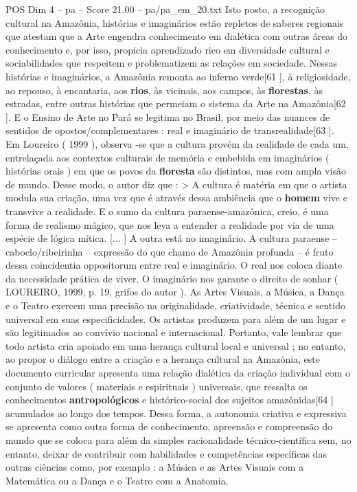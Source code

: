 \begin{textsample}{POS Dim 4 – pa – Score 21.00 – pa/pa\_em\_20.txt}
Isto posto, a recognição cultural na Amazônia, histórias e imaginários estão repletos de saberes regionais que atestam que a Arte engendra conhecimento em dialética com outras áreas do conhecimento e, por isso, propicia aprendizado rico em diversidade cultural e sociabilidades que respeitem e problematizem as relações em sociedade.
Nessas histórias e imaginários, a Amazônia remonta ao inferno verde[61 ], à religiosidade, ao repouso, à encantaria, aos \textbf{rios}, às vicinais, aos campos, às \textbf{florestas}, às estradas, entre outras histórias que permeiam o sistema da Arte na Amazônia[62 ].
E o Ensino de Arte no Pará se legitima no Brasil, por meio das nuances de sentidos de opostos/complementares : real e imaginário de transrealidade[63 ].
Em Loureiro ( 1999 ), observa -se que a cultura provém da realidade de cada um, entrelaçada aos contextos culturais de memória e embebida em imaginários ( histórias orais ) em que os povos da \textbf{floresta} são distintos, mas com ampla visão de mundo.
Desse modo, o autor diz que : > A cultura é matéria em que o artista modula sua criação, uma vez que é através dessa ambiência que o \textbf{homem} vive e transvive a realidade.
E o sumo da cultura paraense-amazônica, creio, é uma forma de realismo mágico, que nos leva a entender a realidade por via de uma espécie de lógica mítica. [... ] A outra está no imaginário.
A cultura paraense – caboclo/ribeirinha – expressão do que chamo de Amazônia profunda – é fruto dessa coincidentia oppositorum entre real e imaginário.
O real nos coloca diante da necessidade prática de viver.
O imaginário nos garante o direito de sonhar ( LOUREIRO, 1999, p. 19, grifos do autor ).
As Artes Visuais, a Música, a Dança e o Teatro exercem uma precisão na originalidade, criatividade, técnica e sentido universal em suas especificidades.
Os artistas produzem para além de um lugar e são legitimados ao convívio nacional e internacional.
Portanto, vale lembrar que todo artista cria apoiado em uma herança cultural local e universal ; no entanto, ao propor o diálogo entre a criação e a herança cultural na Amazônia, este documento curricular apresenta uma relação dialética da criação individual com o conjunto de valores ( materiais e espirituais ) universais, que ressalta os conhecimentos \textbf{antropológicos} e histórico-social dos sujeitos amazônidas[64 ] acumulados ao longo dos tempos.
Dessa forma, a autonomia criativa e expressiva se apresenta como outra forma de conhecimento, apreensão e compreensão do mundo que se coloca para além da simples racionalidade técnico-científica sem, no entanto, deixar de contribuir com habilidades e competências específicas das outras ciências como, por exemplo : a Música e as Artes Visuais com a Matemática ou a Dança e o Teatro com a Anatomia.

\end{textsample}
